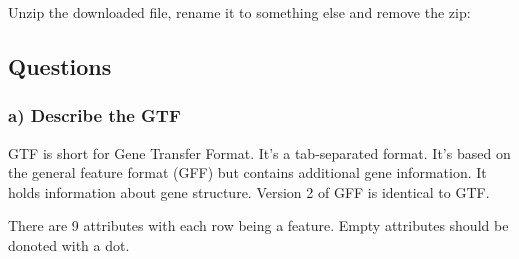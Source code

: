 Unzip the downloaded file, rename it to something else and remove the
zip:

\begin{Shaded}
\begin{Highlighting}[]
\end{Highlighting}
\end{Shaded}

\hypertarget{questions-1}{%
\subsection{Questions}\label{questions-1}}

\hypertarget{a-describe-the-gtf}{%
\subsubsection{a) Describe the GTF}\label{a-describe-the-gtf}}

GTF is short for Gene Transfer Format. It's a tab-separated format. It's
based on the general feature format (GFF) but contains additional gene
information. It holds information about gene structure. Version 2 of GFF
is identical to GTF.

There are 9 attributes with each row being a feature. Empty attributes
should be donoted with a dot.

